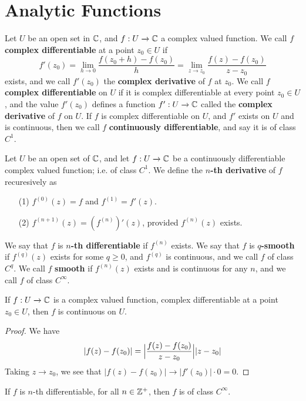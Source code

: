\section{Analytic Functions}

\begin{definition}
    Let $U$ be an open set in  $\mathbb{C}$, and  $f:U \xrightarrow{} \mathbb{C}$ a complex
    valued function. We call $f$  \textbf{complex differentiable} at a point
    $z_0 \in U$ if
    \begin{equation*}
        f'(z_0)=\lim_{h \xrightarrow{} 0}{\frac{f(z_0+h)-f(z_0)}{h}}=
        \lim_{z \xrightarrow{} z_0}{\frac{f(z)-f(z_0)}{z-z_0}}
    \end{equation*}
    exists, and we call $f'(z_0)$ the \textbf{complex derivative} of $f$ at
    $z_0$. We call $f$  \textbf{complex differentiable} on $U$ if it is complex
    differentiable at every point  $z_0 \in U$, and the value $f'(z_0)$ defines
    a function $f':U \xrightarrow{} \mathbb{C}$ called the \textbf{complex derivative}
    of $f$ on  $U$. If  $f$ is complex differentiable on $U$, and  $f'$ exists
    on $U$ and is continuous, then we call $f$ \textbf{continuously
    differentiable}, and say it is of class $C^1$.
\end{definition}

\begin{definition}
    Let $U$ be an open set of $\mathbb{C}$, and let $f:U \xrightarrow{} \mathbb{C}$ be a
    continuously differentiable complex valued function; i.e. of class $C^1$. We
    define the \textbf{$n$-th derivative} of $f$ recuresively as
    \begin{enumerate}
        \item[(1)] $f^{(0)}(z)=f$ and $f^{(1)}=f'(z)$.

        \item[(2)] $f^{(n+1)}(z)=(f^{(n)})'(z)$, provided $f^{(n)}(z)$ exists.
    \end{enumerate}
    We say that $f$ is \textbf{$n$-th differentiable} if $f^{(n)}$ exists. We
    say that $f$ is \textbf{$q$-smooth} if $f^{(q)}(z)$ exists for some $q \geq
    0$, and  $f^{(q)}$ is continuous, and we call $f$ of class $C^q$. We call
    $f$  \textbf{smooth} if $f^{(n)}(z)$ exists and is continuous for any $n$,
    and we call  $f$ of class  $C^\infty$.
\end{definition}

\begin{lemma}\label{3.2.1}
    If $f:U \xrightarrow{} \mathbb{C}$ is a complex valued function, complex
    differentiable at a point $z_0 \in U$, then $f$ is continuous on  $U$.
\end{lemma}
\begin{proof}
    We have
    \begin{equation*}
        |f(z)-f(z_0)|=\Big{|} \frac{f(z)-f(z_0)}{z-z_0} \Big{|}|z-z_0|
    \end{equation*}
    Taking $z \xrightarrow{} z_0$, we see that $|f(z)-f(z_0)| \xrightarrow{}
    |f'(z_0)| \cdot 0=0$.
\end{proof}
\begin{corollary}
    If $f$ is $n$-th differentiable, for all $n \in \mathbb{Z}^+$, then $f$ is of class
    $C^\infty$.
\end{corollary}


